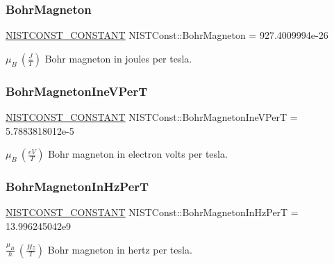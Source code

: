\subsubsection{\texorpdfstring{Bohr\+Magneton}{BohrMagneton}}
{\footnotesize\ttfamily \mbox{\hyperlink{_n_i_s_t_const_8hpp_a2b0fc1d7452373f816175dd86ce26729}{N\+I\+S\+T\+C\+O\+N\+S\+T\+\_\+\+C\+O\+N\+S\+T\+A\+NT}} N\+I\+S\+T\+Const\+::\+Bohr\+Magneton = 927.\+4009994e-\/26}

$\mu_B \ (\frac{J}{T})$ Bohr magneton in joules per tesla. \mbox{\label{group___n_i_s_t_const-_bohr_magneton_ga5a7384205d0127ffe031897a6b0c3dca}} 
\subsubsection{\texorpdfstring{Bohr\+Magneton\+Ine\+V\+PerT}{BohrMagnetonIneVPerT}}
{\footnotesize\ttfamily \mbox{\hyperlink{_n_i_s_t_const_8hpp_a2b0fc1d7452373f816175dd86ce26729}{N\+I\+S\+T\+C\+O\+N\+S\+T\+\_\+\+C\+O\+N\+S\+T\+A\+NT}} N\+I\+S\+T\+Const\+::\+Bohr\+Magneton\+Ine\+V\+PerT = 5.\+7883818012e-\/5}

$\mu_B \ (\frac{eV}{T})$ Bohr magneton in electron volts per tesla. \mbox{\label{group___n_i_s_t_const-_bohr_magneton_gaa57dcf7dffc991b2b8ab1009687691e8}} 
\subsubsection{\texorpdfstring{Bohr\+Magneton\+In\+Hz\+PerT}{BohrMagnetonInHzPerT}}
{\footnotesize\ttfamily \mbox{\hyperlink{_n_i_s_t_const_8hpp_a2b0fc1d7452373f816175dd86ce26729}{N\+I\+S\+T\+C\+O\+N\+S\+T\+\_\+\+C\+O\+N\+S\+T\+A\+NT}} N\+I\+S\+T\+Const\+::\+Bohr\+Magneton\+In\+Hz\+PerT = 13.\+996245042e9}

$\frac{\mu_B}{h} \ (\frac{Hz}{T})$ Bohr magneton in hertz per tesla. \mbox{\label{group___n_i_s_t_const-_bohr_magneton_ga4ad979b4ddb4aeebcbff236726fa64ec}} 
